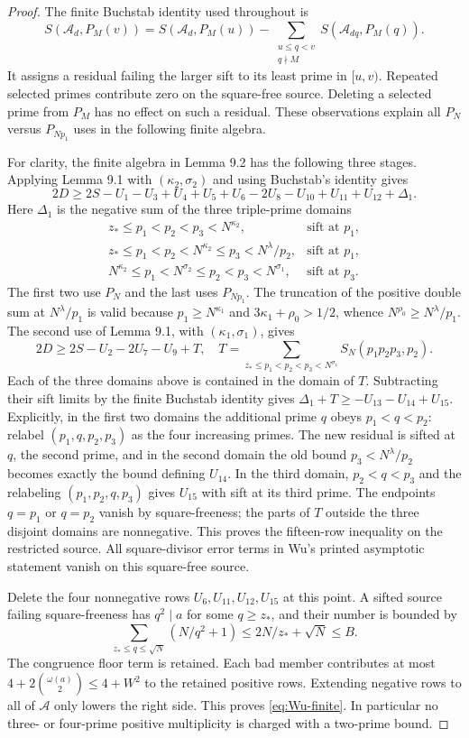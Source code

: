 \documentclass[11pt]{article}
\theoremstyle{definition}
\newcommand{\A}{\mathcal A}
\begin{document}
\begin{proof}
The finite Buchstab identity used throughout is
\[
 S(\A_d,P_M(v))=S(\A_d,P_M(u))
 -\sum_{\substack{u\le q<v\\q\nmid M}}S(\A_{dq},P_M(q)).
\]
It assigns a residual failing the larger sift to its least prime in
$[u,v)$.  Repeated selected primes contribute zero on the square-free
source.  Deleting a selected prime from $P_M$ has no effect on such a
residual.  These observations explain all $P_N$ versus $P_{Np_1}$
uses in the following finite algebra.

For clarity, the finite algebra in Lemma 9.2 has the following three
stages.  Applying Lemma 9.1 with $(\kappa_2,\sigma_2)$ and using
Buchstab's identity gives
\[
 2D\ge 2S-U_1-U_3+U_4+U_5+U_6-2U_8-U_{10}
             +U_{11}+U_{12}+\Delta_1.
\]
Here $\Delta_1$ is the negative sum of the three triple-prime domains
\[
\begin{array}{ll}
 z_*\le p_1<p_2<p_3<N^{\kappa_2},&\text{sift at }p_1,\\
 z_*\le p_1<p_2<N^{\kappa_2}\le p_3<N^{\lambda}/p_2,
 &\text{sift at }p_1,\\
 N^{\kappa_2}\le p_1<N^{\sigma_2}\le p_2<p_3<N^{\sigma_1},
 &\text{sift at }p_3.
\end{array}
\]
The first two use $P_N$ and the last uses $P_{Np_1}$.  The truncation
of the positive double sum at $N^{\lambda}/p_1$ is valid because
$p_1\ge N^{\kappa_1}$ and $3\kappa_1+\rho_0>1/2$, whence
$N^{\rho_0}\ge N^{\lambda}/p_1$.  The second use of Lemma 9.1, with
$(\kappa_1,\sigma_1)$, gives
\[
 2D\ge2S-U_2-2U_7-U_9+T,
 \quad T=\sum_{z_*\le p_1<p_2<p_3<N^{\sigma_1}}S_N(p_1p_2p_3,p_2).
\]
Each of the three domains above is contained in the domain of $T$.
Subtracting their sift limits by the finite Buchstab identity gives
$\Delta_1+T\ge-U_{13}-U_{14}+U_{15}$.
Explicitly, in the first two domains the additional prime $q$ obeys
$p_1<q<p_2$: relabel $(p_1,q,p_2,p_3)$ as the four increasing
primes.  The new residual is sifted at $q$, the second prime, and
in the second domain the old bound $p_3<N^{\lambda}/p_2$ becomes
exactly the bound defining $U_{14}$.  In the third domain,
$p_2<q<p_3$ and the relabeling $(p_1,p_2,q,p_3)$ gives $U_{15}$
with sift at its third prime.  The endpoints $q=p_1$ or $q=p_2$
vanish by square-freeness; the parts of $T$ outside the three
disjoint domains are nonnegative.
This proves the fifteen-row inequality on the restricted source.  All
square-divisor error terms in Wu's printed asymptotic statement vanish
on this square-free source.

Delete the four nonnegative rows $U_6,U_{11},U_{12},U_{15}$ at this
point.  A sifted source failing square-freeness has $q^2\mid a$ for
some $q\ge z_*$, and their number is bounded by
\[
 \sum_{z_*\le q\le\sqrt N}(N/q^2+1)
 \le2N/z_*+\sqrt N\le B.
\]
The congruence floor term is retained.  Each bad member contributes at
most $4+2\binom{\omega(a)}2\le4+W^2$ to the retained positive rows.
Extending negative rows to all of $\A$ only lowers the right side.
This proves \eqref{eq:Wu-finite}.  In particular no three- or four-prime
positive multiplicity is charged with a two-prime bound.
\end{proof}
\end{document}
